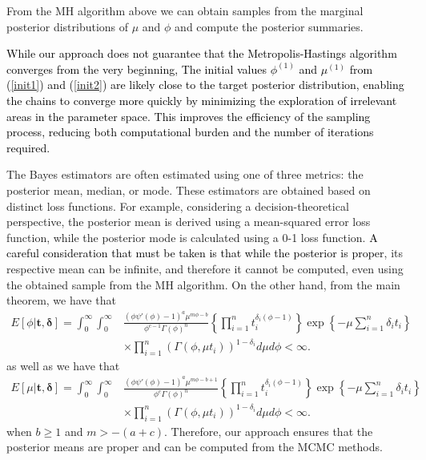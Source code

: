 \documentclass[]{interact}
\theoremstyle{plain}%
\theoremstyle{definition}
\theoremstyle{remark}
\begin{document}
From the MH algorithm above we can obtain samples from the marginal posterior distributions of $\mu$ and $\phi$ and compute the posterior summaries. 

\textcolor{black}{While our approach does not guarantee that the Metropolis-Hastings algorithm converges from the very beginning, The initial values  $\phi^{(1)}$ and $\mu^{(1)}$ from (\ref{init1}) and (\ref{init2}) are likely close to the target posterior distribution, enabling the chains to converge more quickly by minimizing the exploration of irrelevant areas in the parameter space. This improves the efficiency of the sampling process, reducing both computational burden and the number of iterations required.}

The Bayes estimators are often estimated using one of three metrics: the posterior mean, median, or mode. These estimators are obtained based on distinct loss functions. For example, considering a decision-theoretical perspective, the posterior mean is derived using a mean-squared error loss function, while the posterior mode is calculated using a 0-1 loss function. \textcolor{black}{A careful consideration that must be taken is that while the posterior is proper}, its respective mean can be infinite, and therefore it cannot be computed, even using the obtained sample from the MH algorithm. On the other hand, from the main theorem, we have that
\begin{equation*}
\begin{aligned}
E[\phi|\boldsymbol{t,\delta}]=\int_0^{\infty}\int_0^{\infty}&\frac{(\phi\psi'(\phi)-1)^{a}\mu^{m\phi-b}}{\phi^{c-1}\Gamma(\phi)^n}\left\{\prod_{i=1}^n{t_i^{\delta_i(\phi-1)}}\right\}\exp\left\{-\mu\sum_{i=1}^n {\delta_i}t_i\right\}\\&\times\prod_{i=1}^n\left(\Gamma(\phi,\mu t_i)\right)^{1-\delta_i} d\mu d\phi<\infty.
\end{aligned}
\end{equation*}
as well as we have that
\begin{equation*}
\begin{aligned}
E[\mu|\boldsymbol{t,\delta}]=\int_0^{\infty}\int_0^{\infty}&\frac{(\phi\psi'(\phi)-1)^{a}\mu^{m\phi-b+1}}{\phi^{c}\Gamma(\phi)^n}\left\{\prod_{i=1}^n{t_i^{\delta_i(\phi-1)}}\right\}\exp\left\{-\mu\sum_{i=1}^n {\delta_i}t_i\right\}\\&\times\prod_{i=1}^n\left(\Gamma(\phi,\mu t_i)\right)^{1-\delta_i} d\mu d\phi<\infty.
\end{aligned}
\end{equation*}
when $b\geq 1$ and $m>-(a+c)$. Therefore, our approach ensures that the posterior means are proper and can be computed from the MCMC methods.
\end{document}
